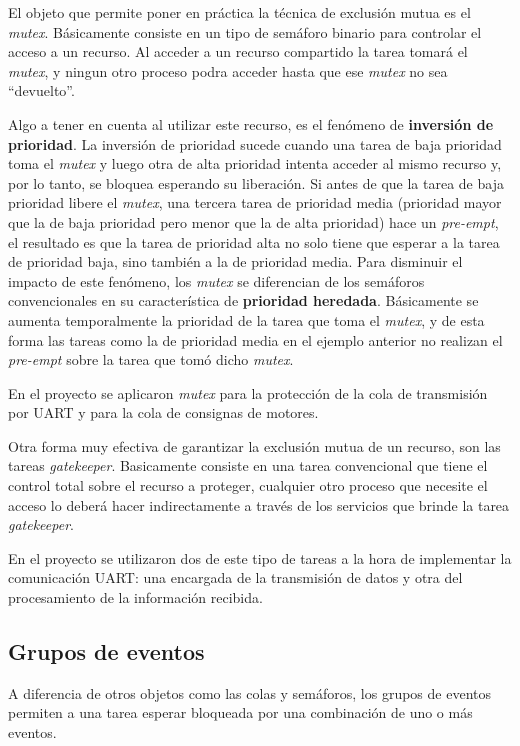 \documentclass{IEEEtran}
\begin{document}
El objeto que permite poner en práctica la técnica de exclusión mutua es el \textit{mutex}. Básicamente consiste en un tipo de semáforo binario para controlar el acceso a un recurso. Al acceder a un recurso compartido la tarea tomará el \textit{mutex}, y ningun otro proceso podra acceder hasta que ese \textit{mutex} no sea ``devuelto''.

Algo a tener en cuenta al utilizar este recurso, es el fenómeno de \textbf{inversión de prioridad}. La inversión de prioridad sucede cuando una tarea de baja prioridad toma el \textit{mutex} y luego otra de alta prioridad intenta acceder al mismo recurso y, por lo tanto, se bloquea esperando su liberación. Si antes de que la tarea de baja prioridad libere el \textit{mutex}, una tercera tarea de prioridad media (prioridad mayor que la de baja prioridad pero menor que la de alta prioridad) hace un \textit{pre-empt}, el resultado es que la tarea de prioridad alta no solo tiene que esperar a la tarea de prioridad baja, sino también a la de prioridad media. Para disminuir el impacto de este fenómeno, los \textit{mutex} se diferencian de los semáforos convencionales en su característica de \textbf{prioridad heredada}. Básicamente se aumenta temporalmente la prioridad de la tarea que toma el \textit{mutex}, y de esta forma las tareas como la de prioridad media en el ejemplo anterior no realizan el \textit{pre-empt} sobre la tarea que tomó dicho \textit{mutex}.

En el proyecto se aplicaron \textit{mutex} para la protección de la cola de transmisión por UART y para la cola de consignas de motores.

Otra forma muy efectiva de garantizar la exclusión mutua de un recurso, son las tareas \textit{gatekeeper}. Basicamente consiste en una tarea convencional que tiene el control total sobre el recurso a proteger, cualquier otro proceso que necesite el acceso lo deberá hacer indirectamente a través de los servicios que brinde la tarea \textit{gatekeeper}. 

En el proyecto se utilizaron dos de este tipo de tareas a la hora de implementar la comunicación UART: una encargada de la transmisión de datos y otra del procesamiento de la información recibida.

\subsection{Grupos de eventos}
A diferencia de otros objetos como las colas y semáforos, los grupos de eventos permiten a una tarea esperar bloqueada por una combinación de uno o más eventos.
\end{document}

